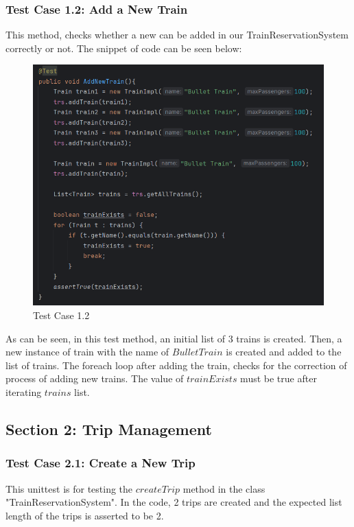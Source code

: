 \documentclass{article}
\begin{document}
\pagebreak

\subsubsection{Test Case 1.2: Add a New Train}
This method, checks whether a new can be added in our TrainReservationSystem correctly or not. The snippet of code can be seen below:

\begin{figure}[h]
  \centering
  \includegraphics[width=1.0\textwidth]{pictures/T1-2.png}
  \caption{Test Case 1.2}
  \label{fig:your_label}
\end{figure}

\bigskip

As can be seen, in this test method, an initial list of 3 trains is created. Then, a new instance of train with the name of $Bullet Train$ is created and added to the list of trains. The foreach loop after adding the train, checks for the correction of process of adding new trains. The value of $trainExists$ must be true after iterating $trains$ list.

\pagebreak

\subsection{Section 2: Trip Management}
\subsubsection{Test Case 2.1: Create a New Trip}
This unittest is for testing the $createTrip$ method in the class "TrainReservationSystem". In the code, 2 trips are created and the expected list length of the trips is asserted to be 2.
\end{document}
